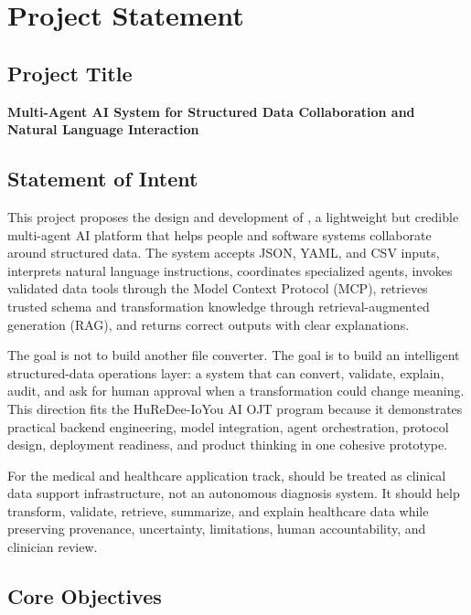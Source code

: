 \section{Project Statement}

\subsection{Project Title}

\textbf{Multi-Agent AI System for Structured Data Collaboration and Natural Language Interaction}

\subsection{Statement of Intent}

This project proposes the design and development of \projectname{}, a lightweight but credible multi-agent AI platform that helps people and software systems collaborate around structured data. The system accepts JSON, YAML, and CSV inputs, interprets natural language instructions, coordinates specialized agents, invokes validated data tools through the Model Context Protocol (MCP), retrieves trusted schema and transformation knowledge through retrieval-augmented generation (RAG), and returns correct outputs with clear explanations.

The goal is not to build another file converter. The goal is to build an intelligent structured-data operations layer: a system that can convert, validate, explain, audit, and ask for human approval when a transformation could change meaning. This direction fits the HuReDee-IoYou AI OJT program because it demonstrates practical backend engineering, model integration, agent orchestration, protocol design, deployment readiness, and product thinking in one cohesive prototype.

For the medical and healthcare application track, \projectname{} should be treated as clinical data support infrastructure, not an autonomous diagnosis system. It should help transform, validate, retrieve, summarize, and explain healthcare data while preserving provenance, uncertainty, limitations, human accountability, and clinician review.

\subsection{Core Objectives}

